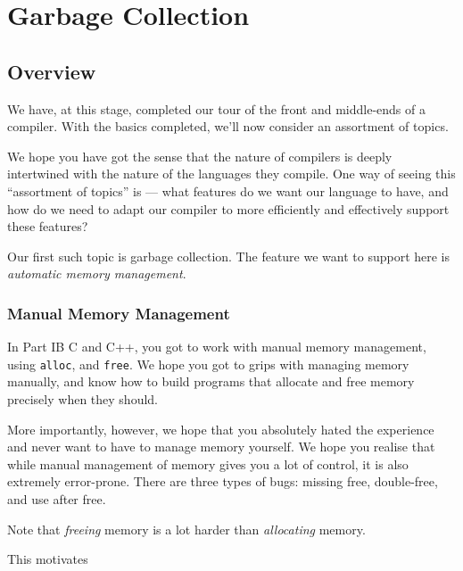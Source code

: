 \chapter{Garbage Collection}

\section{Overview}
We have, at this stage, completed our tour of the front and middle-ends of a compiler. With the basics completed, we'll now consider an assortment of topics. 

We hope you have got the sense that the nature of compilers is deeply intertwined with the nature of the languages they compile. One way of seeing this ``assortment of topics'' is --- what features do we want our language to have, and how do we need to adapt our compiler to more efficiently and effectively support these features? 

Our first such topic is garbage collection. The feature we want to support here is \textit{automatic memory management}.

\subsection{Manual Memory Management}
In \textsf{Part IB C and C++}, you got to work with manual memory management, using \texttt{alloc}, and \texttt{free}. We hope you got to grips with managing memory manually, and know how to build programs that allocate and free memory precisely when they should. 

More importantly, however, we hope that you absolutely hated the experience and never want to have to manage memory yourself. We hope you realise that while manual management of memory gives you a lot of control, it is also extremely error-prone. There are three types of bugs: missing free, double-free, and use after free.



Note that \textit{freeing} memory is a lot harder than \textit{allocating} memory.

This motivates

\subsection{}